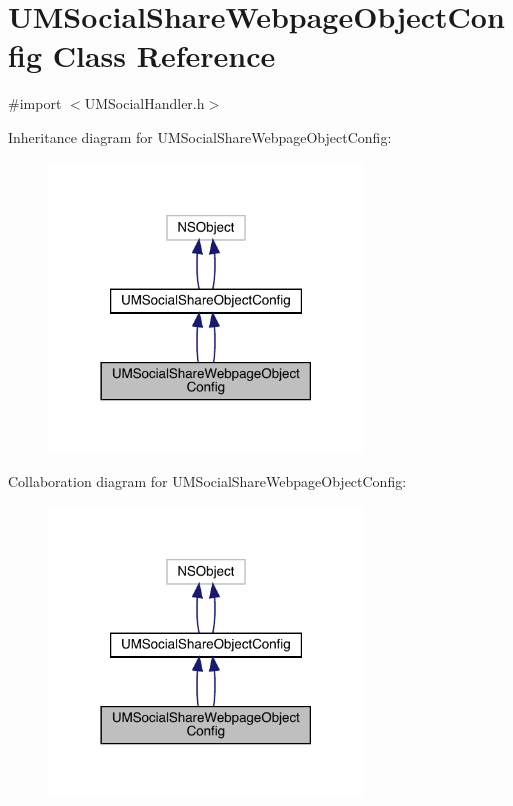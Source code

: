 \hypertarget{interface_u_m_social_share_webpage_object_config}{}\section{U\+M\+Social\+Share\+Webpage\+Object\+Config Class Reference}
\label{interface_u_m_social_share_webpage_object_config}


{\ttfamily \#import $<$U\+M\+Social\+Handler.\+h$>$}



Inheritance diagram for U\+M\+Social\+Share\+Webpage\+Object\+Config\+:\nopagebreak
\begin{figure}[H]
\begin{center}
\leavevmode
\includegraphics[width=237pt]{interface_u_m_social_share_webpage_object_config__inherit__graph}
\end{center}
\end{figure}


Collaboration diagram for U\+M\+Social\+Share\+Webpage\+Object\+Config\+:\nopagebreak
\begin{figure}[H]
\begin{center}
\leavevmode
\includegraphics[width=237pt]{interface_u_m_social_share_webpage_object_config__coll__graph}
\end{center}
\end{figure}

